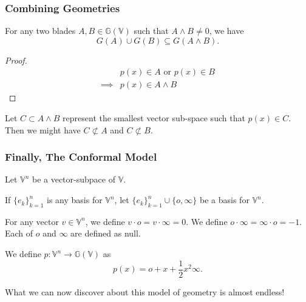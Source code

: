 \documentclass{beamer}
\newcommand{\G}{\mathbb{G}}
\newcommand{\V}{\mathbb{V}}
\newcommand{\nvao}{o}
\newcommand{\nvai}{\infty}
\begin{document}
\begin{frame}
\frametitle{Combining Geometries}
\begin{lemma}
For any two blades $A,B\in\G(\V)$ such that $A\wedge B\neq 0$, we have
\begin{equation*}
G(A)\cup G(B)\subseteq G(A\wedge B).
\end{equation*}
\end{lemma}
\begin{proof}
\begin{align*}
 & \mbox{$p(x)\in A$ or $p(x)\in B$} \\
\implies & \mbox{$p(x)\in A\wedge B$}
\end{align*}
\end{proof}
Let $C\subset A\wedge B$ represent the smallest vector sub-space such that $p(x)\in C$.
Then we might have $C\not\subset A$ and $C\not\subset B$.
\end{frame}


\begin{frame}
\frametitle{Finally, The Conformal Model}
Let $\V^n$ be a vector-subpace of $\V$.

If $\{e_k\}_{k=1}^n$ is any basis for $\V^n$, let $\{e_k\}_{k=1}^n\cup\{\nvao,\nvai\}$
be a basis for $\V^n$.
\begin{definition}
For any vector $v\in\V^n$, we define $v\cdot\nvao=v\cdot\nvai=0$.  We
define $\nvao\cdot\nvai=\nvai\cdot\nvao=-1$.  Each of $\nvao$ and $\nvai$
are defined as null.
\end{definition}
\begin{definition}
We define $p:\V^n\to\G(\V)$ as
\begin{equation*}
p(x) = \nvao + x + \frac{1}{2}x^2\nvai.
\end{equation*}
\end{definition}
What we can now discover about this model of geometry is almost endless!
\end{frame}
\end{document}
